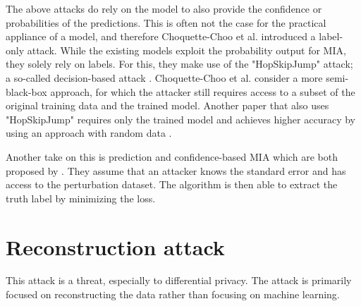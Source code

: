 The above attacks do rely on the model to also provide the confidence or probabilities of the predictions.
This is often not the case for the practical appliance of a model, and therefore Choquette-Choo et al. introduced a label-only attack.
While the existing models exploit the probability output for MIA, they solely rely on labels.
For this, they make use of the "HopSkipJump" attack; a so-called decision-based attack \citep{chen_hopskipjumpattack_2020}.
Choquette-Choo et al. consider a more semi-black-box approach, for which the attacker still requires access to a subset of the original training data and the trained model.
Another paper that also uses "HopSkipJump" requires only the trained model and achieves higher accuracy by using an approach with random data \citep{li_membership_2021}.

Another take on this is prediction and confidence-based MIA which are both proposed by \citep{yeom_privacy_2018}.
They assume that an attacker knows the standard error and has access to the perturbation dataset.
The algorithm is then able to extract the truth label by minimizing the loss. \newline

\newpage
\section{Reconstruction attack}
This attack is a threat, especially to differential privacy.
The attack is primarily focused on reconstructing the data rather than focusing on machine learning.


